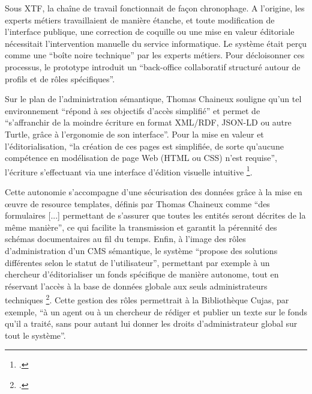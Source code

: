 Sous \ac{XTF}, la chaîne de travail fonctionnait de façon chronophage. A l'origine, les experts métiers travaillaient de manière étanche, et toute modification de l'interface publique, une correction de coquille ou une mise en valeur éditoriale nécessitait l'intervention manuelle du service informatique. Le système était perçu comme une \enquote{boîte noire technique} par les experts métiers. Pour décloisonner ces processus, le prototype introduit un \enquote{back-office collaboratif structuré autour de profils et de rôles spécifiques}. 

Sur le plan de l'administration sémantique, Thomas Chaineux souligne qu'un tel environnement \enquote{répond à ses objectifs d’accès simplifié} et permet de \enquote{s’affranchir de la moindre écriture en format \ac{XML}/\ac{RDF}, \ac{JSON-LD} ou autre Turtle, grâce à l’ergonomie de son interface}. Pour la mise en valeur et l'éditorialisation, \enquote{la création de ces pages est simplifiée, de sorte qu’aucune compétence en modélisation de page Web (\ac{HTML} ou CSS) n’est requise}, l'écriture s'effectuant via une interface d'édition visuelle intuitive \footcite{chaineuxLentreeDansWeb}.

Cette autonomie s'accompagne d'une sécurisation des données grâce à la mise en œuvre de resource templates, définis par Thomas Chaineux comme \enquote{des formulaires [...] permettant de s’assurer que toutes les entités seront décrites de la même manière}, ce qui facilite la transmission et garantit la pérennité des schémas documentaires au fil du temps. Enfin, à l'image des rôles d'administration d'un \ac{CMS} sémantique, le système \enquote{propose des solutions différentes selon le statut de l’utilisateur}, permettant par exemple à un chercheur d'éditorialiser un fonds spécifique de manière autonome, tout en réservant l'accès à la base de données globale aux seuls administrateurs techniques \footcite{chaineuxLentreeDansWeb}. Cette gestion des rôles permettrait à la Bibliothèque Cujas, par exemple, \enquote{à un agent ou à un chercheur de rédiger et publier un texte sur le fonds qu'il a traité, sans pour autant lui donner les droits d'administrateur global sur tout le système}.    
